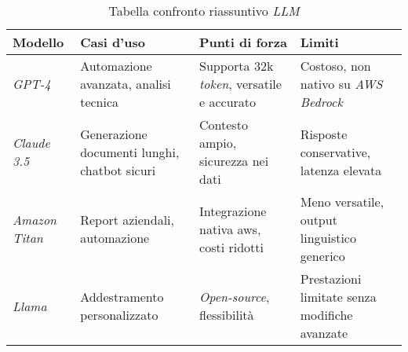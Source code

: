 \begin{table}[H]
    \centering
    \begin{tabularx}{\textwidth}{|>{\centering\arraybackslash}X|>{\centering\arraybackslash}X|>{\centering\arraybackslash}X|>{\centering\arraybackslash}X|}
        \hline
        \rowcolor{green!30} %
        \textbf{Modello} & \textbf{Casi d'uso} & \textbf{Punti di forza} & \textbf{Limiti} \\
        \hline
        \textit{GPT-4} & Automazione avanzata, analisi tecnica & Supporta 32k \textit{token}, versatile e accurato & Costoso, non nativo su \textit{AWS Bedrock} \\
        \hline
        \textit{Claude 3.5} & Generazione documenti lunghi, chatbot sicuri & Contesto ampio, sicurezza nei dati & Risposte conservative, latenza elevata \\
        \hline
        \textit{Amazon Titan} & Report aziendali, automazione & Integrazione nativa \gls{aws}, costi ridotti & Meno versatile, output linguistico generico \\
        \hline
        \textit{Llama} & Addestramento personalizzato & \textit{Open-source}, flessibilità & Prestazioni limitate senza modifiche avanzate \\
        \hline
    \end{tabularx}
    \caption{Tabella confronto riassuntivo \textit{LLM}}
    \label{tab:confronto-lllm}
\end{table}
